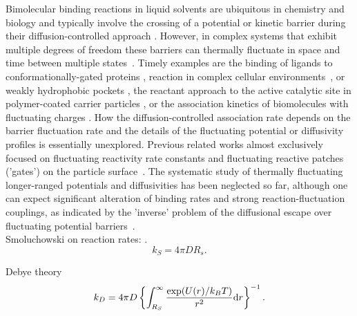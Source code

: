 \documentclass[preprint,superscriptaddress]{revtex4-1}
\begin{document}
Bimolecular binding reactions  in liquid solvents are ubiquitous in chemistry and biology and typically involve the crossing of a potential or kinetic barrier during their diffusion-controlled approach \cite{Calef1983, berg1985diffusion}. However, in complex systems that exhibit multiple degrees of freedom these barriers can thermally fluctuate in space and time between multiple states~\cite{Calef1983, berg1985diffusion,kang,zwanzig}. Timely examples are the binding of ligands to conformationally-gated proteins \cite{Szabo1982,greives}, reaction in complex cellular environments~\cite{noe},  or weakly hydrophobic pockets \cite{Setny2013, Mondal2013}, the reactant approach to the active catalytic site in polymer-coated carrier particles \cite{Wu2012a, stefano}, or the association kinetics of biomolecules with fluctuating charges \cite{kirkwood,mikael}. How the diffusion-controlled association rate depends on the barrier fluctuation rate and the details of the fluctuating potential or diffusivity profiles is essentially unexplored. Previous related works almost exclusively focused on fluctuating reactivity rate constants and fluctuating reactive patches ('gates')  on the particle surface~\cite{Calef1983, berg1985diffusion,kang,zwanzig}. The systematic study of thermally fluctuating longer-ranged potentials and diffusivities has been neglected so far, although one can expect significant alteration of binding rates and strong reaction-fluctuation couplings, as indicated by the 'inverse' problem of the diffusional escape over fluctuating potential barriers~\cite{Doering1992, Zurcher1993, Pechukas1994, Reimann1995, Reimann1995a}.\\


Smoluchowski on reaction rates: \cite{Smoluchowski1916, Smoluchowski1917a}. \\
\begin{equation}
    k_S = 4 \pi D R_s.
\end{equation}

Debye theory \cite{Debye1942}
\begin{equation}
    k _{D} =4 \pi D \left\{\int_{R_S}^\infty\frac{\exp(U(r)/k_BT)}{r^2}{\rm d}r\right\}^{-1}.
    \label{SD_rate_slow_intro}
\end{equation}
\end{document}
